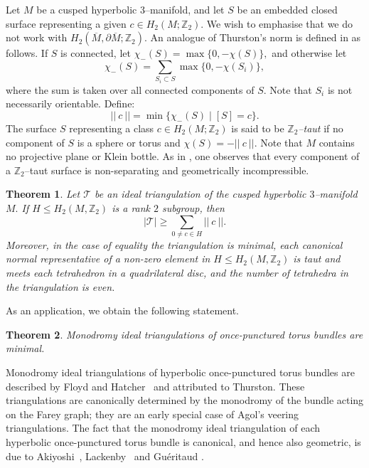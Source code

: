 \documentclass[a4paper]{gtart}
\def\tri{\mathcal{T}}
\def\manifold{M}
\def\Z{\mathbb{Z}}
\theoremstyle{plain}
\newtheorem{theorem}{Theorem}%
\theoremstyle{definition}
\theoremstyle{remark}
\numberwithin{equation}{section}
\begin{document}
Let $\manifold$ be a cusped hyperbolic 3--manifold, and let
$S$ be an embedded closed surface representing a given $c \in H_2(\manifold;\Z_2).$ 
We wish to emphasise that we do not work with $H_2(\overline{\manifold}, \partial \overline{\manifold} ;\Z_2).$
An analogue of Thurston's norm \cite{Thurston-norm-1986} is defined in \cite{Jaco-Z2-2013} as follows. If $S$ is connected, let $\chi_{-}(S) = \max \{ 0,-\chi(S)\},$ and otherwise let
\[\chi_{-}(S) = \sum_{S_i\subset S} \max \{ 0,-\chi(S_i)\},\]
where the sum is taken over all connected components of $S.$ Note that $S_i$ is not necessarily orientable. Define:
\[|| \ c \ || = \min \{ \chi_{-}(S) \mid [S]= c\}.\]
The surface $S$ representing a class $c \in H_2(\manifold;\Z_2)$ is said to be \emph{$\Z_2$--taut} if no component of $S$ is a sphere or torus and $\chi(S) = -|| \ c \ ||.$ Note that $\manifold$ contains no projective plane or Klein bottle.
As in \cite{Thurston-norm-1986}, one observes that every component of a $\Z_2$--taut surface is non-separating and geometrically incompressible.

\begin{theorem}
  \label{thm:sumofnorms}
  Let $\tri$ be an ideal triangulation of the cusped hyperbolic $3$--manifold $\manifold.$ If $H \le H_2 (\manifold,\Z_2)$ is a rank $2$ subgroup, then 
  $$|\tri| \geq \sum \limits_{0 \neq c \in H} || \ c\ ||. $$
   Moreover, in the case of equality the triangulation is minimal, each canonical normal representative of a non-zero element in $H\le H_2 (\manifold,\Z_2)$ is taut and meets each tetrahedron in a quadrilateral disc, and the number of tetrahedra in the triangulation is even.
\end{theorem}

As an application, we obtain the following statement.

\begin{theorem}
  \label{thm:torusbundles}
  Monodromy ideal triangulations of once-punctured torus bundles are minimal.
\end{theorem}

Monodromy ideal triangulations of hyperbolic once-punctured torus bundles are described by Floyd and Hatcher~\cite{Floyd-incompressible-1982} and attributed to Thurston. These triangulations are canonically determined by the monodromy of the bundle acting on the Farey graph; they are an early special case of Agol's veering triangulations. The fact that the monodromy ideal triangulation of each hyperbolic once-punctured torus bundle is canonical, and hence also geometric, is due to Akiyoshi~\cite{Akiyoshi99CanonicityLayeredTorusBundles}, Lackenby~\cite{Lackenby-canonical-2003} and Gu\'eritaud \cite{GueritaudPhDThesis}.
\end{document}
